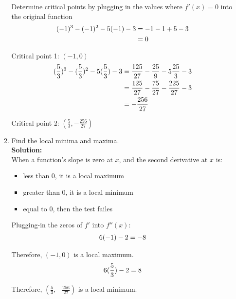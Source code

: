 \documentclass[a4paper]{article}
\begin{document}
\begin{enumerate}
\begin{enumerate}
Determine critical points by plugging in the values where $f'(x) = 0$ into the original function\\



\begin{align*}
	(-1)^3 - (-1)^2 - 5(-1) - 3 &= -1 -1 +5 -3\notag\\
	&= 0
\end{align*}
	
Critical point 1: $(-1,0)$\\

\begin{align*}
	(\frac{5}{3})^3 - (\frac{5}{3})^2 - 5(\frac{5}{3}) - 3 &= \frac{125}{27} - \frac{25}{9} - 5\frac{25}{3} - 3\notag\\
	&= \frac{125}{27} - \frac{75}{27} - \frac{225}{27} - 3\notag\\
	&= -\frac{256}{27}
\end{align*}

Critical point 2: $(\frac{5}{3},-\frac{256}{27})$\\	
	
	\item Find the local minima and maxima.\\
	\textbf{Solution:}\\

When a function's slope is zero at $x$, and the second derivative at $x$ is:

\begin{itemize}
	\item less than 0, it is a local maximum
	\item greater than 0, it is a local minimum
	\item equal to 0, then the test failes
\end{itemize}

Plugging-in the zeros of $f'$ into $f''(x)$:\\

\begin{align*}
	6(-1) -2 = -8\notag\\
\end{align*}

Therefore, $(-1,0)$ is a local maximum.\\

\begin{align*}
	6(\frac{5}{3}) -2 = 8\notag\\
\end{align*}

Therefore, $(\frac{5}{3},-\frac{256}{27})$ is a local minimum.\\


\end{enumerate}
\end{enumerate}
\end{document}
